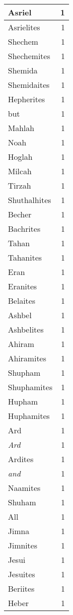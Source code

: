 \begin{center}
\begin{longtable}{l|r}
Asriel & 1\\ \hline 
Asrielites & 1\\ \hline 
Shechem & 1\\ \hline 
Shechemites & 1\\ \hline 
Shemida & 1\\ \hline 
Shemidaites & 1\\ \hline 
Hepherites & 1\\ \hline 
but & 1\\ \hline 
Mahlah & 1\\ \hline 
Noah & 1\\ \hline 
Hoglah & 1\\ \hline 
Milcah & 1\\ \hline 
Tirzah & 1\\ \hline 
Shuthalhites & 1\\ \hline 
Becher & 1\\ \hline 
Bachrites & 1\\ \hline 
Tahan & 1\\ \hline 
Tahanites & 1\\ \hline 
Eran & 1\\ \hline 
Eranites & 1\\ \hline 
Belaites & 1\\ \hline 
Ashbel & 1\\ \hline 
Ashbelites & 1\\ \hline 
Ahiram & 1\\ \hline 
Ahiramites & 1\\ \hline 
Shupham & 1\\ \hline 
Shuphamites & 1\\ \hline 
Hupham & 1\\ \hline 
Huphamites & 1\\ \hline 
Ard & 1\\ \hline 
\emph{Ard} & 1\\ \hline 
Ardites & 1\\ \hline 
\emph{and} & 1\\ \hline 
Naamites & 1\\ \hline 
Shuham & 1\\ \hline 
All & 1\\ \hline 
Jimna & 1\\ \hline 
Jimnites & 1\\ \hline 
Jesui & 1\\ \hline 
Jesuites & 1\\ \hline 
Beriites & 1\\ \hline 
Heber & 1\\ \hline 

\end{longtable}
\end{center}
